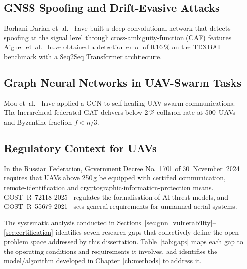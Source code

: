 \subsection{GNSS Spoofing and Drift-Evasive Attacks}

Borhani-Darian et~al.~\cite{borhani_2024_uav} have built a deep
convolutional network that detects spoofing at the signal level
through cross-ambiguity-function (CAF) features. Aigner
et~al.~\cite{aigner_2025_uav} have obtained a detection error of
0.16\,\% on the TEXBAT benchmark with a Seq2Seq Transformer
architecture.

\subsection{Graph Neural Networks in UAV-Swarm Tasks}

Mou et~al.~\cite{mou_2021_uav} have applied a GCN to self-healing
UAV-swarm communications. The hierarchical federated GAT
\cite{hfgat_2025_uav} delivers below-2\,\% collision rate at 500~UAVs
and Byzantine fraction $f<n/3$.

\subsection{Regulatory Context for UAVs}

In the Russian Federation, Government Decree No.~1701 of
30~November~2024~\cite{decree_1701} requires that UAVs above 250\,g
be equipped with certified communication, remote-identification and
cryptographic-information-protection means. \mbox{GOST~R~72118-2025}~\cite{GOST_R_72118_2025} regulates the
formalisation of AI threat models, and
\mbox{GOST~R~55679-2021}~\cite{GOST_R_55679_2021} sets general
requirements for unmanned aerial systems.

\label{sec:gap_summary}%

The systematic analysis conducted in Sections~\ref{sec:gnn_vulnerability}--\ref{sec:certification} identifies seven research gaps that collectively define the open problem space addressed by this dissertation. Table~\ref{tab:gaps} maps each gap to the operating conditions and requirements it involves, and identifies the model/algorithm developed in Chapter~\ref{ch:methods} to address it.

